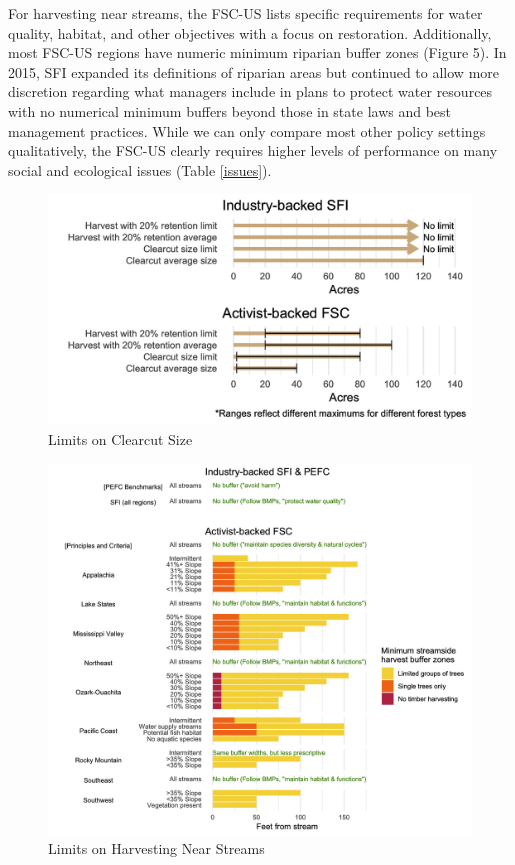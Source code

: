 \documentclass[
      12pt,
            Review ]{article}
\begin{document}
For harvesting near streams, the FSC-US lists specific requirements for water quality, habitat, and other objectives with a focus on restoration. Additionally, most FSC-US regions have numeric minimum riparian buffer zones (Figure 5). In 2015, SFI expanded its definitions of riparian areas but continued to allow more discretion regarding what managers include in plans to protect water resources with no numerical minimum buffers beyond those in state laws and best management practices. While we can only compare most other policy settings qualitatively, the FSC-US clearly requires higher levels of performance on many social and ecological issues (Table \ref{issues}).

\begin{figure}
\centering
\includegraphics{clearcuts-1.png}
\caption{Limits on Clearcut Size\label{clearcuts}}
\end{figure}

\begin{figure}
\centering
\includegraphics{riparian-1.png}
\caption{Limits on Harvesting Near Streams\label{riparian}}
\end{figure}
\end{document}
